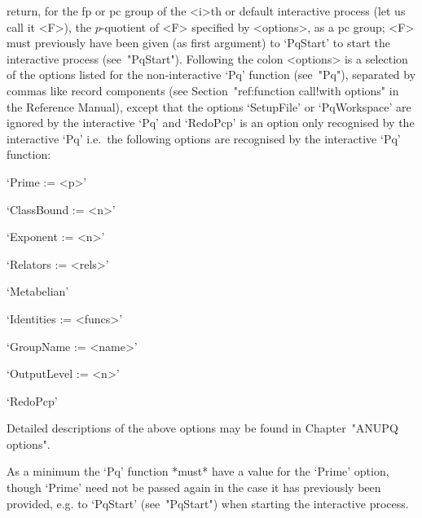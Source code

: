 return, for the fp or pc  group  of  the  <i>th  or  default  interactive
{\ANUPQ} process (let us call it <F>), the $p$-quotient of <F>  specified
by <options>, as a pc group; <F> must  previously  have  been  given  (as
first argument) to `PqStart' to start the  interactive  {\ANUPQ}  process
(see~"PqStart"). Following the colon <options>  is  a  selection  of  the
options  listed  for  the  non-interactive  `Pq'   function   (see~"Pq"),
separated by commas like  record  components  (see  Section~"ref:function
call!with options" in the  {\GAP}  Reference  Manual),  except  that  the
options `SetupFile' or `PqWorkspace' are ignored by the interactive  `Pq'
and `RedoPcp' is an  option  only  recognised  by  the  interactive  `Pq'
i.e.~the  following  options  are  recognised  by  the  interactive  `Pq'
function:

\beginlist%

\item{}`Prime := <p>'

\item{}`ClassBound := <n>'

\item{}`Exponent := <n>'

\item{}`Relators := <rels>'

\item{}`Metabelian'

\item{}`Identities := <funcs>'

\item{}`GroupName := <name>'

\item{}`OutputLevel := <n>'

\item{}`RedoPcp'

\endlist

Detailed descriptions of the above options may be found in Chapter~"ANUPQ
options".

As a minimum the `Pq' function  *must*  have  a  value  for  the  `Prime'
option, though `Prime' need not be  passed  again  in  the  case  it  has
previously been provided, e.g. to `PqStart' (see~"PqStart") when starting
the interactive process.

